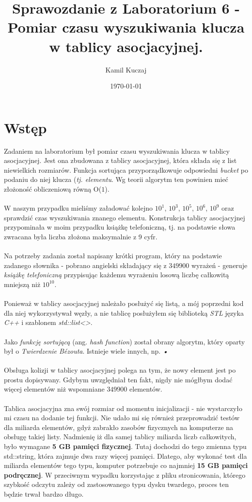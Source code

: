\documentclass[11pt,a4paper]{article}
\author{Kamil Kuczaj}
\title{Sprawozdanie z Laboratorium 6 - Pomiar czasu wyszukiwania klucza w tablicy asocjacyjnej.}
\date{\today}
\begin{document}
\maketitle

\section{Wstęp}
\hspace{4ex}Zadaniem na laboratorium był pomiar czasu wyszukiwania klucza w tablicy asocjacyjnej. Jest ona zbudowana z tablicy asocjacyjnej, która składa się z list niewielkich rozmiarów. Funkcja sortująca przyporządkowuje odpowiedni \textit{bucket} po podaniu do niej klucza (\textit{tj. elementu}. Wg teorii algorytm ten powinien mieć złożoność obliczeniową równą O($1$).\\\\W naszym przypadku mieliśmy załadować kolejno $10^1$, $10^3$, $10^5$, $10^6$, $10^9$ oraz sprawdzić czas wyszukiwania znanego elementu. Konstrukcja tablicy asocjacyjnej przypominała w moim przypadku książkę telefoniczną, tj. na podstawie słowa zwracana była liczba złożona maksymalnie z 9 cyfr.\\\\Na potrzeby zadania został napisany krótki program, który na podstawie zadanego słownika - pobrano angielski składający się z $349900$ wyrażeń - generuje \textit{książkę telefoniczną} przypisując każdemu wyrażeniu losową liczbę całkowitą mniejszą niż $10^10$.\\\\Ponieważ w tablicy asocjacyjnej należało posłużyć się listą, a mój poprzedni kod dla niej wykorzystywał węzły, a nie tablicę posłużyłem się biblioteką \textit{STL} języka \textit{C++} i szablonem \textit{std::list<>}.\\\\Jako \textit{funkcję sortującą} (ang. \textit{hash function}) został obrany algorytm, który oparty był o \textit{Twierdzenie Bézouta}. Istnieje wiele innych, np. \textit{•}\\\\Obsługa kolizji w tablicy asocjacyjnej polega na tym, że nowy element jest po prostu dopisywany. Gdybym uwzględniał ten fakt, nigdy nie mógłbym dodać więcej elementów niż wspomniane $349900$ elementów.\\\\Tablica asocjacyjna zna swój rozmiar od momentu inicjalizacji - nie wystarczyło mi czasu na dodanie tej funkcji. Nie udało mi się również przeprowadzić testów dla miliarda elementów, gdyż zabrakło zasobów fizycznych na komputerze na obsługę takiej listy. Nadmienię iż dla samej tablicy miliarda liczb całkowitych, było wymagane \textbf{5 GB pamięci fizycznej}. Tutaj dochodzi do tego zmienna typu std::string, która zajmuje dwa razy więcej pamięci. Dlatego, aby wykonać test dla miliarda elementów tego typu, komputer potrzebuje co najmniej \textbf{15 GB pamięci podręcznej}. W przeciwnym wypadku korzystając z pliku stronicowania, którego szybkość odczytu zależy od zastosowanego typu dysku twardego, proces ten będzie trwał bardzo długo.
\end{document}
